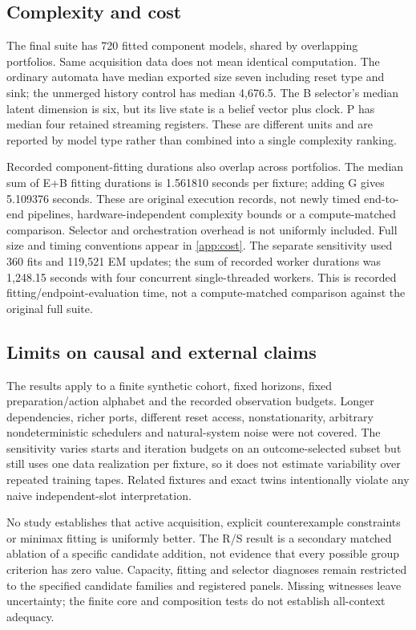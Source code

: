 \subsection{Complexity and cost}
The final suite has 720 fitted component models, shared by overlapping portfolios. Same acquisition data does not mean identical computation. The ordinary automata have median exported size seven including reset type and sink; the unmerged history control has median 4,676.5. The B selector's median latent dimension is six, but its live state is a belief vector plus clock. P has median four retained streaming registers. These are different units and are reported by model type rather than combined into a single complexity ranking.

Recorded component-fitting durations also overlap across portfolios. The median sum of E+B fitting durations is 1.561810 seconds per fixture; adding G gives 5.109376 seconds. These are original execution records, not newly timed end-to-end pipelines, hardware-independent complexity bounds or a compute-matched comparison. Selector and orchestration overhead is not uniformly included. Full size and timing conventions appear in \cref{app:cost}. The separate sensitivity used 360 fits and 119,521 EM updates; the sum of recorded worker durations was 1,248.15 seconds with four concurrent single-threaded workers. This is recorded fitting/endpoint-evaluation time, not a compute-matched comparison against the original full suite.

\subsection{Limits on causal and external claims}
The results apply to a finite synthetic cohort, fixed horizons, fixed preparation/action alphabet and the recorded observation budgets. Longer dependencies, richer ports, different reset access, nonstationarity, arbitrary nondeterministic schedulers and natural-system noise were not covered. The sensitivity varies starts and iteration budgets on an outcome-selected subset but still uses one data realization per fixture, so it does not estimate variability over repeated training tapes. Related fixtures and exact twins intentionally violate any naive independent-slot interpretation.

No study establishes that active acquisition, explicit counterexample constraints or minimax fitting is uniformly better. The R/S result is a secondary matched ablation of a specific candidate addition, not evidence that every possible group criterion has zero value. Capacity, fitting and selector diagnoses remain restricted to the specified candidate families and registered panels. Missing witnesses leave uncertainty; the finite core and composition tests do not establish all-context adequacy.

